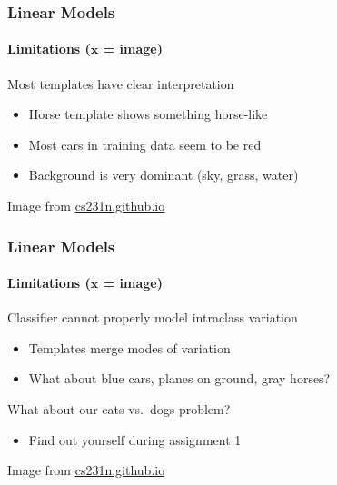 \documentclass[xetex,professionalfont]{beamer}
\renewcommand{\vec}[1]{\ensuremath{\mathbf{#1}}}
\newcommand{\vx}{\vec{x}}
\begin{document}
\begin{frame}
  \frametitle{Linear Models}
  \framesubtitle{Limitations ($\vx$ = image)}

Most templates have clear interpretation %
\begin{itemize}
    \item Horse template shows something horse-like
    \item Most cars in training data seem to be red
    \item Background is very dominant (sky, grass, water)
\end{itemize}

\smallskip

\begin{center}
    {\centering Image from \href{http://cs231n.github.io/}{cs231n.github.io}}
\end{center}

\end{frame}


\begin{frame}
  \frametitle{Linear Models}
  \framesubtitle{Limitations ($\vx$ = image)}

Classifier cannot properly model intraclass variation
\begin{itemize}
    \item Templates merge modes of variation
    \item What about blue cars, planes on ground, gray horses?
\end{itemize}

\bigskip

What about our cats vs.~dogs problem?
\begin{itemize}
    \item Find out yourself during assignment 1
\end{itemize}

\smallskip

\begin{center}
    {\centering Image from \href{http://cs231n.github.io/}{cs231n.github.io}}
\end{center}

\end{frame}
\end{document}
